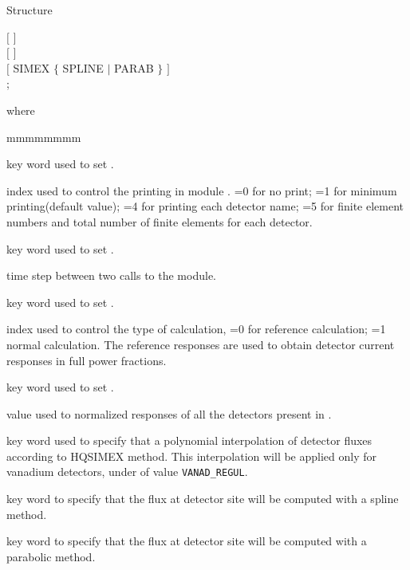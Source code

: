 \begin{DataStructure}{Structure }

$[$   $]$ 
  
   \\
$[$   $]$  \\
$[$ SIMEX $\{$ SPLINE $|$ PARAB $\}$ $]$ \\
;
\end{DataStructure}

\noindent where
\begin{ListeDeDescription}{mmmmmmmm}

\item[\moc{EDIT}] key word used to set .

\item[\dusa{iprt}] index used to control the printing in module . =0 for no print; =1 for minimum printing(default value); 
=4 for printing each detector name; =5 for finite element numbers 
and total number of finite elements for each detector. 

\item[\moc{TIME}] key word used to set .

\item[\dusa{dt}] time step between two calls to the  module. 

\item[\moc{REF}] key word used to set .

\item[\dusa{kc}] index used to control the type of calculation,
 =0 for reference calculation; =1 normal calculation. The reference responses are
used to obtain detector current responses in full power fractions.

\item[\moc{NORM}] key word used to set .

\item[\dusa{vnorm}] value used to normalized responses of all the detectors
present in .

\item[\moc{SIMEX}] key word used to specify that a polynomial interpolation of 
detector fluxes according to HQSIMEX method. This interpolation will be 
applied only for vanadium detectors, under  of value 
\texttt{VANAD\_REGUL}.

\item[\moc{SPLINE}] key word to specify that the flux at detector site
will be computed with a spline method. 

\item[\moc{PARAB}] key word to specify that the flux at detector site
will be computed with a parabolic method. 

\end{ListeDeDescription}
\clearpage
